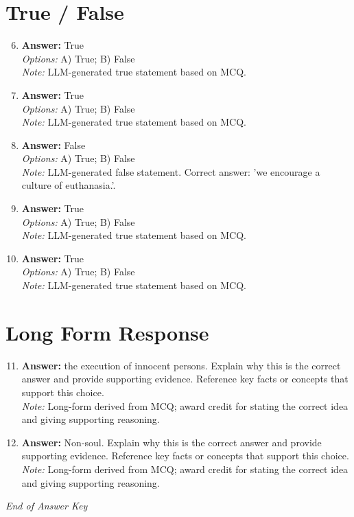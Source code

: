 \documentclass[12pt]{article}
\begin{document}
\section*{True / False}
\begin{enumerate}[label=\arabic*.]
\setcounter{enumi}{5}
\item \textbf{Answer:} True
\\ \textit{Options:} A) True; B) False
\\ \textit{Note:} LLM-generated true statement based on MCQ.
\item \textbf{Answer:} True
\\ \textit{Options:} A) True; B) False
\\ \textit{Note:} LLM-generated true statement based on MCQ.
\item \textbf{Answer:} False
\\ \textit{Options:} A) True; B) False
\\ \textit{Note:} LLM-generated false statement. Correct answer: 'we encourage a culture of euthanasia.'.
\item \textbf{Answer:} True
\\ \textit{Options:} A) True; B) False
\\ \textit{Note:} LLM-generated true statement based on MCQ.
\item \textbf{Answer:} True
\\ \textit{Options:} A) True; B) False
\\ \textit{Note:} LLM-generated true statement based on MCQ.
\end{enumerate}

\section*{Long Form Response}
\begin{enumerate}[label=\arabic*.]
\setcounter{enumi}{10}
\item \textbf{Answer:} the execution of innocent persons. Explain why this is the correct answer and provide supporting evidence. Reference key facts or concepts that support this choice.
\\ \textit{Note:} Long-form derived from MCQ; award credit for stating the correct idea and giving supporting reasoning.
\item \textbf{Answer:} Non-soul. Explain why this is the correct answer and provide supporting evidence. Reference key facts or concepts that support this choice.
\\ \textit{Note:} Long-form derived from MCQ; award credit for stating the correct idea and giving supporting reasoning.
\end{enumerate}

\vfill
\noindent\textit{End of Answer Key}
\end{document}
